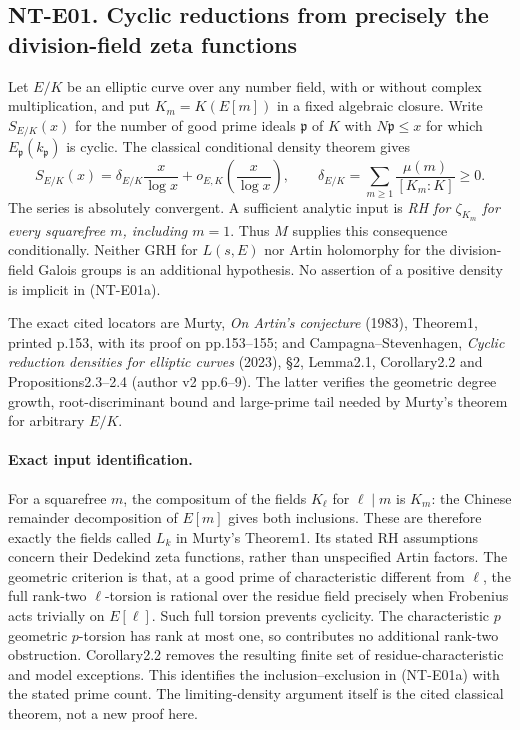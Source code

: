 \documentclass[11pt,a4paper]{article}
\begin{document}
\subsection*{NT-E01. Cyclic reductions from precisely the division-field zeta functions}
Let $E/K$ be an elliptic curve over any number field, with or without
complex multiplication, and put $K_m=K(E[m])$ in a fixed algebraic closure.
Write $S_{E/K}(x)$ for the number of good prime ideals $\mathfrak p$ of
$K$ with $N\mathfrak p\le x$ for which $E_{\mathfrak p}(k_{\mathfrak p})$
is cyclic. The classical conditional density theorem gives
\[
 S_{E/K}(x)=\delta_{E/K}\frac{x}{\log x}
                 +o_{E,K}\!\left(\frac{x}{\log x}\right),\qquad
 \delta_{E/K}=\sum_{m\ge1}\frac{\mu(m)}{[K_m:K]}\ge0.       \tag{NT-E01a}
\]
The series is absolutely convergent. A sufficient analytic input is
\emph{RH for $\zeta_{K_m}$ for every squarefree $m$, including $m=1$}.
Thus $M$ supplies this consequence conditionally. Neither GRH for
$L(s,E)$ nor Artin holomorphy for the division-field Galois groups is an
additional hypothesis. No assertion of a positive density is implicit
in (NT-E01a).

The exact cited locators are Murty, \emph{On Artin's conjecture}
(1983), Theorem1, printed p.153, with its proof on pp.153--155;
and Campagna--Stevenhagen, \emph{Cyclic reduction densities for
elliptic curves} (2023), \S2, Lemma2.1, Corollary2.2 and
Propositions2.3--2.4 (author v2 pp.6--9). The latter verifies the
geometric degree growth, root-discriminant bound and large-prime
tail needed by Murty's theorem for arbitrary $E/K$.

\paragraph{Exact input identification.}
For a squarefree $m$, the compositum of the fields $K_\ell$ for
$\ell\mid m$ is $K_m$: the Chinese remainder decomposition of
$E[m]$ gives both inclusions. These are therefore exactly the fields
called $L_k$ in Murty's Theorem1. Its stated RH assumptions concern
their Dedekind zeta functions, rather than unspecified Artin factors.
The geometric criterion is that, at a good prime of characteristic
different from $\ell$, the full rank-two $\ell$-torsion is rational
over the residue field precisely when Frobenius acts trivially on
$E[\ell]$. Such full torsion prevents cyclicity. The characteristic
$p$ geometric $p$-torsion has rank at most one, so contributes no
additional rank-two obstruction. Corollary2.2 removes the resulting
finite set of residue-characteristic and model exceptions. This
identifies the inclusion--exclusion in (NT-E01a) with the stated
prime count. The limiting-density argument itself is the cited
classical theorem, not a new proof here.
\end{document}
